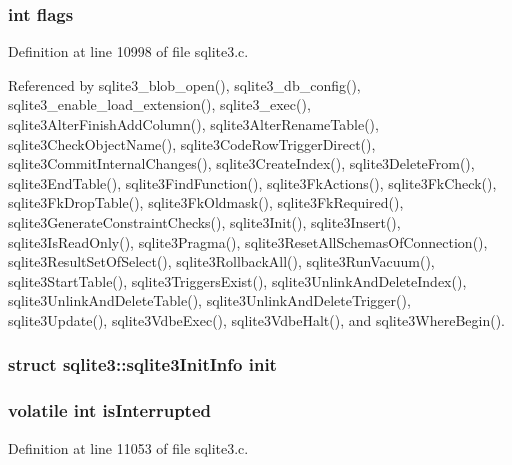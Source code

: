 \subsubsection[{flags}]{\setlength{\rightskip}{0pt plus 5cm}int flags}\label{structsqlite3_ac8bf36fe0577cba66bccda3a6f7e80a4}


Definition at line 10998 of file sqlite3.\+c.



Referenced by sqlite3\+\_\+blob\+\_\+open(), sqlite3\+\_\+db\+\_\+config(), sqlite3\+\_\+enable\+\_\+load\+\_\+extension(), sqlite3\+\_\+exec(), sqlite3\+Alter\+Finish\+Add\+Column(), sqlite3\+Alter\+Rename\+Table(), sqlite3\+Check\+Object\+Name(), sqlite3\+Code\+Row\+Trigger\+Direct(), sqlite3\+Commit\+Internal\+Changes(), sqlite3\+Create\+Index(), sqlite3\+Delete\+From(), sqlite3\+End\+Table(), sqlite3\+Find\+Function(), sqlite3\+Fk\+Actions(), sqlite3\+Fk\+Check(), sqlite3\+Fk\+Drop\+Table(), sqlite3\+Fk\+Oldmask(), sqlite3\+Fk\+Required(), sqlite3\+Generate\+Constraint\+Checks(), sqlite3\+Init(), sqlite3\+Insert(), sqlite3\+Is\+Read\+Only(), sqlite3\+Pragma(), sqlite3\+Reset\+All\+Schemas\+Of\+Connection(), sqlite3\+Result\+Set\+Of\+Select(), sqlite3\+Rollback\+All(), sqlite3\+Run\+Vacuum(), sqlite3\+Start\+Table(), sqlite3\+Triggers\+Exist(), sqlite3\+Unlink\+And\+Delete\+Index(), sqlite3\+Unlink\+And\+Delete\+Table(), sqlite3\+Unlink\+And\+Delete\+Trigger(), sqlite3\+Update(), sqlite3\+Vdbe\+Exec(), sqlite3\+Vdbe\+Halt(), and sqlite3\+Where\+Begin().

\hypertarget{structsqlite3_a1fe3b706937b668b0caecfb669600f38}{}
\subsubsection[{init}]{\setlength{\rightskip}{0pt plus 5cm}struct {\bf sqlite3\+::sqlite3\+Init\+Info}  init}\label{structsqlite3_a1fe3b706937b668b0caecfb669600f38}
\hypertarget{structsqlite3_a22888dff41ab98e8e8ebb4cc2c4bf43e}{}
\subsubsection[{is\+Interrupted}]{\setlength{\rightskip}{0pt plus 5cm}volatile int is\+Interrupted}\label{structsqlite3_a22888dff41ab98e8e8ebb4cc2c4bf43e}


Definition at line 11053 of file sqlite3.\+c.

